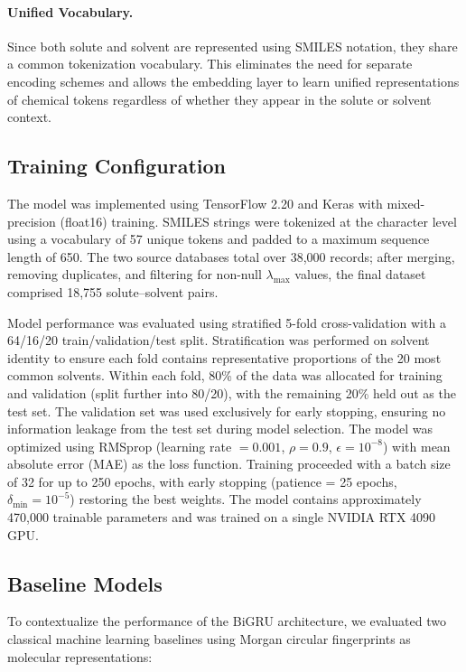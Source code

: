 \documentclass[11pt,a4paper]{article}
\begin{document}
\paragraph{Unified Vocabulary.} Since both solute and solvent are represented using SMILES notation, they share a common tokenization vocabulary. This eliminates the need for separate encoding schemes and allows the embedding layer to learn unified representations of chemical tokens regardless of whether they appear in the solute or solvent context.



\subsection{Training Configuration}

The model was implemented using TensorFlow 2.20 and Keras with mixed-precision (float16) training. SMILES strings were tokenized at the character level using a vocabulary of 57 unique tokens and padded to a maximum sequence length of 650. The two source databases total over 38,000 records; after merging, removing duplicates, and filtering for non-null $\lambda_{\max}$ values, the final dataset comprised 18,755 solute--solvent pairs.

Model performance was evaluated using stratified 5-fold cross-validation with a 64/16/20 train/validation/test split. Stratification was performed on solvent identity to ensure each fold contains representative proportions of the 20 most common solvents. Within each fold, 80\% of the data was allocated for training and validation (split further into 80/20), with the remaining 20\% held out as the test set. The validation set was used exclusively for early stopping, ensuring no information leakage from the test set during model selection. The model was optimized using RMSprop (learning rate $= 0.001$, $\rho = 0.9$, $\epsilon = 10^{-8}$) with mean absolute error (MAE) as the loss function. Training proceeded with a batch size of 32 for up to 250 epochs, with early stopping (patience = 25 epochs, $\delta_{\min} = 10^{-5}$) restoring the best weights. The model contains approximately 470,000 trainable parameters and was trained on a single NVIDIA RTX 4090 GPU.

\subsection{Baseline Models}

To contextualize the performance of the BiGRU architecture, we evaluated two classical machine learning baselines using Morgan circular fingerprints \cite{morganGenerationMachineSorted1965} as molecular representations:
\end{document}
